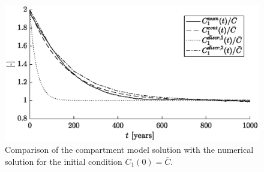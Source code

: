 \begin{figure}[!htp]
	\centering
	\includegraphics[scale=1]{fig/problem2box/C1vsC1tilde1_1000years2.eps}
	\caption{Comparison of the compartment model solution with the numerical solution for the initial condition $C_1(0) = \bar C$.}
	\label{fig:comparison_comp-real1}
\end{figure}